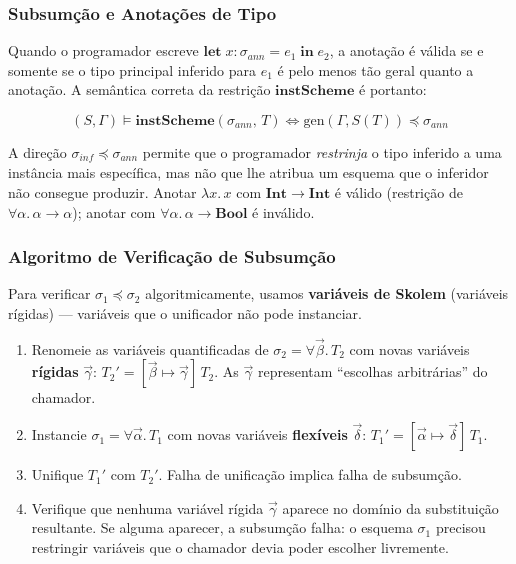   \subsubsection*{Subsumção e Anotações de Tipo}

  Quando o programador escreve
  \(\mathbf{let}\; x {:} \sigma_{\mathit{ann}} = e_1\; \mathbf{in}\; e_2\),
  a anotação é válida se e somente se o tipo principal inferido para
  \(e_1\) é pelo menos tão geral quanto a anotação. A semântica correta
  da restrição \(\mathbf{instScheme}\) é portanto:

  \[
    (S, \Gamma) \models \mathbf{instScheme}(\sigma_{\mathit{ann}},\, T)
    \iff \mathrm{gen}(\Gamma, S(T)) \preceq \sigma_{\mathit{ann}}
  \]

  \begin{remark}
    A direção \(\sigma_{\mathit{inf}} \preceq \sigma_{\mathit{ann}}\)
    permite que o programador \emph{restrinja} o tipo inferido a uma
    instância mais específica, mas não que lhe atribua um esquema que o
    inferidor não consegue produzir.  Anotar \(\lambda x.\, x\) com
    \(\mathbf{Int} \to \mathbf{Int}\) é válido (restrição de
    \(\forall \alpha.\, \alpha \to \alpha\)); anotar com
    \(\forall \alpha.\, \alpha \to \mathbf{Bool}\) é inválido.
  \end{remark}

  \subsubsection*{Algoritmo de Verificação de Subsumção}

  Para verificar \(\sigma_1 \preceq \sigma_2\) algoritmicamente, usamos
  \textbf{variáveis de Skolem} (variáveis rígidas) — variáveis que o
  unificador não pode instanciar.

  \begin{enumerate}
    \item Renomeie as variáveis quantificadas de
      \(\sigma_2 = \forall \vec{\beta}.\, T_2\) com novas variáveis
      \textbf{rígidas} \(\vec{\gamma}\):
      \(T_2' = [\vec{\beta} \mapsto \vec{\gamma}]\, T_2\).
      As \(\vec{\gamma}\) representam ``escolhas arbitrárias'' do chamador.
    \item Instancie \(\sigma_1 = \forall \vec{\alpha}.\, T_1\) com
      novas variáveis
      \textbf{flexíveis} \(\vec{\delta}\):
      \(T_1' = [\vec{\alpha} \mapsto \vec{\delta}]\, T_1\).
    \item Unifique \(T_1'\) com \(T_2'\). Falha de unificação implica
      falha de subsumção.
    \item Verifique que nenhuma variável rígida \(\vec{\gamma}\) aparece
      no domínio da substituição resultante.  Se alguma aparecer, a
      subsumção falha: o esquema \(\sigma_1\) precisou restringir variáveis
      que o chamador devia poder escolher livremente.
  \end{enumerate}

